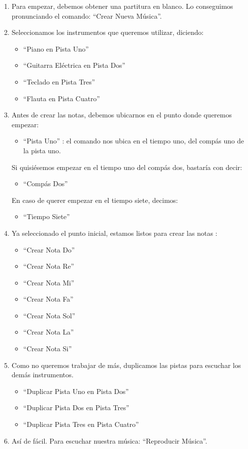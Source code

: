 \begin{enumerate}
\item Para empezar, debemos obtener una partitura en blanco. Lo conseguimos pronunciando el comando: ``Crear Nueva M\'usica''.
\item Seleccionamos los instrumentos que queremos utilizar, diciendo:
\begin{itemize}
    \item ``Piano en Pista Uno''
    \item ``Guitarra El\'ectrica en Pista Dos''
    \item ``Teclado en Pista Tres''
    \item ``Flauta en Pista Cuatro''
\end{itemize}
\item Antes de crear las notas, debemos ubicarnos en el punto donde queremos empezar:
\begin{itemize}
\item ``Pista Uno'' : el comando nos ubica en el tiempo uno, del comp\'as uno de la pista uno.
\end{itemize}
    Si quisi\'esemos empezar en el tiempo uno del comp\'as dos, bastar\'ia con decir:
\begin{itemize}
\item ``Comp\'as Dos''
\end{itemize}
    En caso de querer empezar en el tiempo siete, decimos:
\begin{itemize}
\item ``Tiempo Siete''
\end{itemize}
\item Ya seleccionado el punto inicial, estamos listos para crear las notas :
\begin{itemize}
    \item ``Crear Nota Do''
    \item ``Crear Nota Re''
    \item ``Crear Nota Mi''
    \item ``Crear Nota Fa''
    \item ``Crear Nota Sol''
    \item ``Crear Nota La''
    \item ``Crear Nota Si''
\end{itemize}
\item Como no queremos trabajar de m\'as, duplicamos las pistas para escuchar los dem\'as instrumentos.
\begin{itemize}
    \item ``Duplicar Pista Uno en Pista Dos''
    \item  ``Duplicar Pista Dos en Pista Tres''
    \item ``Duplicar Pista Tres en Pista Cuatro''
\end{itemize}
\item As\'i de f\'acil. Para escuchar nuestra m\'usica: ``Reproducir M\'usica''.
\end{enumerate}

